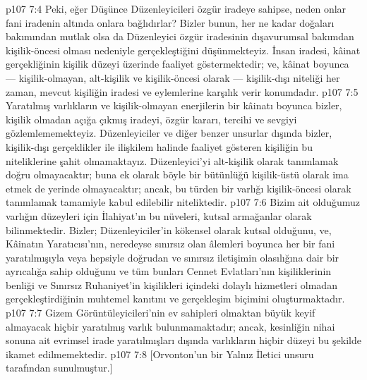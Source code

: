 \vs p107 7:4 Peki, eğer Düşünce Düzenleyicileri özgür iradeye sahipse, neden onlar fani iradenin altında onlara bağlıdırlar? Bizler bunun, her ne kadar doğaları bakımından mutlak olsa da Düzenleyici özgür iradesinin dışavurumsal bakımdan kişilik\hyp{}öncesi olması nedeniyle gerçekleştiğini düşünmekteyiz. İnsan iradesi, kâinat gerçekliğinin kişilik düzeyi üzerinde faaliyet göstermektedir; ve, kâinat boyunca --- kişilik\hyp{}olmayan, alt\hyp{}kişilik ve kişilik\hyp{}öncesi olarak --- kişilik\hyp{}dışı niteliği her zaman, mevcut kişiliğin iradesi ve eylemlerine karşılık verir konumdadır.
\vs p107 7:5 Yaratılmış varlıkların ve kişilik\hyp{}olmayan enerjilerin bir kâinatı boyunca bizler, kişilik olmadan açığa çıkmış iradeyi, özgür kararı, tercihi ve sevgiyi gözlemlememekteyiz. Düzenleyiciler ve diğer benzer unsurlar dışında bizler, kişilik\hyp{}dışı gerçeklikler ile ilişkilem halinde faaliyet gösteren kişiliğin bu niteliklerine şahit olmamaktayız. Düzenleyici’yi alt\hyp{}kişilik olarak tanımlamak doğru olmayacaktır; buna ek olarak böyle bir bütünlüğü kişilik\hyp{}üstü olarak ima etmek de yerinde olmayacaktır; ancak, bu türden bir varlığı kişilik\hyp{}öncesi olarak tanımlamak tamamiyle kabul edilebilir niteliktedir.
\vs p107 7:6 Bizim ait olduğumuz varlığın düzeyleri için İlahiyat’ın bu nüveleri, kutsal armağanlar olarak bilinmektedir. Bizler; Düzenleyiciler’in kökensel olarak kutsal olduğunu, ve, Kâinatın Yaratıcısı’nın, neredeyse sınırsız olan âlemleri boyunca her bir fani yaratılmışıyla veya hepsiyle doğrudan ve sınırsız iletişimin olasılığına dair bir ayrıcalığa sahip olduğunu ve tüm bunları Cennet Evlatları’nın kişiliklerinin benliği ve Sınırsız Ruhaniyet’in kişilikleri içindeki dolaylı hizmetleri olmadan gerçekleştirdiğinin muhtemel kanıtını ve gerçekleşim biçimini oluşturmaktadır.
\vs p107 7:7 Gizem Görüntüleyicileri’nin ev sahipleri olmaktan büyük keyif almayacak hiçbir yaratılmış varlık bulunmamaktadır; ancak, kesinliğin nihai sonuna ait evrimsel irade yaratılmışları dışında varlıkların hiçbir düzeyi bu şekilde ikamet edilmemektedir.
\vs p107 7:8 [Orvonton’un bir Yalnız İletici unsuru tarafından sunulmuştur.]
